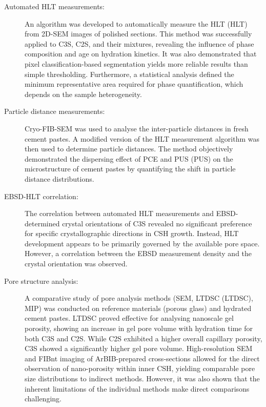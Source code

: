\begin{description}
    \item[Automated \ac{HLT} measurements:]
    An algorithm was developed to automatically measure the \acl{HLT} (\acs{HLT}) from 2D-\ac{SEM} images of polished sections.
    This method was successfully applied to \ac{C3S}, \ac{C2S}, and their mixtures, revealing the influence of phase composition and age on hydration kinetics.
    It was also demonstrated that pixel classification-based segmentation yields more reliable results than simple thresholding.
    Furthermore, a statistical analysis defined the minimum representative area required for phase quantification, which depends on the sample heterogeneity.

    \item[Particle distance measurements:]
    Cryo-\acs{FIB}-\ac{SEM} was used to analyse the inter-par\-ti\-cle distances in fresh cement pastes.
    A modified version of the \ac{HLT} measurement algorithm was then used to determine particle distances.
    The method objectively demonstrated the dispersing effect of \acl{PCE} and \acl{PUS} (\acs{PUS}) on the microstructure of cement pastes by quantifying the shift in particle distance distributions.

    \item[\ac{EBSD}-\ac{HLT} correlation:]
    The correlation between automated \ac{HLT} measurements and \ac{EBSD}-determined crystal orientations of \ac{C3S} revealed no significant preference for specific crystallographic directions in \ac{CSH} growth.
    Instead, \ac{HLT} development appears to be primarily governed by the available pore space.
    However, a correlation between the \ac{EBSD} measurement density and the crystal orientation was observed.

    \item[Pore structure analysis:]
    A comparative study of pore analysis methods (\ac{SEM}, \acl{LTDSC} (\acs{LTDSC}), \acl{MIP}) was conducted on reference materials (porous glass) and hydrated cement pastes.
    \ac{LTDSC} proved effective for analysing nanoscale gel porosity, showing an increase in gel pore volume with hydration time for both \ac{C3S} and \ac{C2S}.
    While \ac{C2S} exhibited a higher overall capillary porosity, \ac{C3S} showed a significantly higher gel pore volume.
    High-resolution \ac{SEM} and \ac{FIBnt} imaging of \ac{ArBIB}-prepared cross-sections allowed for the direct observation of nano-porosity within inner \ac{CSH}, yielding comparable pore size distributions to indirect methods.
    However, it was also shown that the inherent limitations of the individual methods make direct comparisons challenging.

\end{description}

